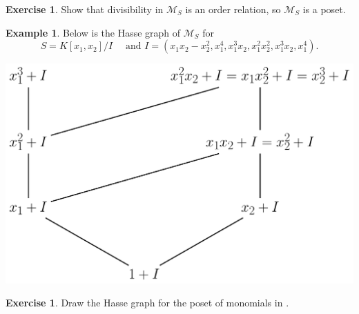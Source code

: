 \documentclass[11pt]{amsart}
\newcommand{\M}{{\mathcal M}}
\theoremstyle{plain} %
\theoremstyle{definition}
\newtheorem{ex}[thm]{Example}
\newtheorem{exer}[thm]{Exercise}
\theoremstyle{remark}
\numberwithin{equation}{section}  %
\begin{document}
\begin{tcolorbox}[reset]
\begin{exer}\label{ex:poset M_S}
Show that divisibility in $\M_S$ is an order relation, so $\M_S$ is a poset. 
\end{exer}
\end{tcolorbox}


\begin{ex}\label{ex:diagram}
Below is the Hasse graph of $\M_S$ for
\[
S=K[x_1,x_2]/I \quad \text{ and } I=(x_1x_2-x_2^2, x_1^4,x_1^3x_2, x_1^2x_2^2, x_1^3x_2, x_1^4).
\]
\begin{center}
\includegraphics[width=0.43 \textwidth]{Pictures/glue_example.pdf}
\end{center}
\end{ex}

\begin{tcolorbox}[reset]
\begin{exer}
Draw the Hasse graph for the poset of monomials in .
\end{exer}
\end{tcolorbox}
\end{document}

